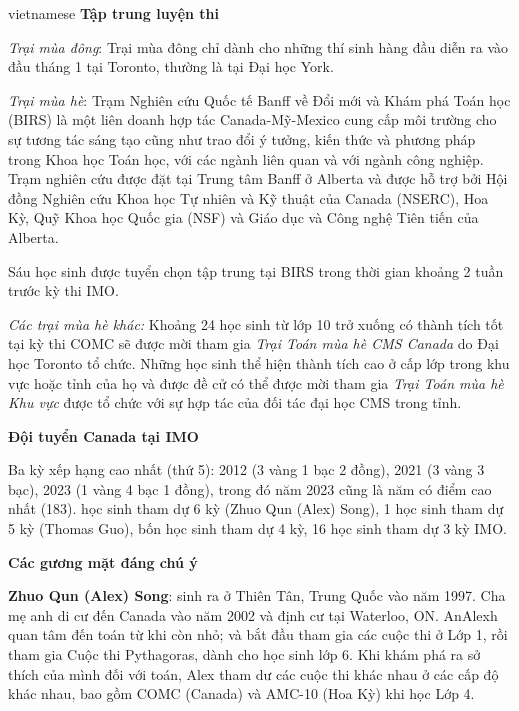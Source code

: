 \documentclass{article}
\begin{document}
\begin{otherlanguage*}{vietnamese}
\newpage
\textbf{Tập trung luyện thi}

\textit{Trại mùa đông}: Trại mùa đông chỉ dành cho những thí sinh hàng đầu diễn ra vào đầu tháng 1 tại Toronto, thường là tại Đại học York.

\textit{Trại mùa hè}: Trạm Nghiên cứu Quốc tế Banff về Đổi mới và Khám phá Toán học (BIRS) là một liên doanh hợp tác Canada-Mỹ-Mexico cung cấp môi trường cho sự tương tác sáng tạo cũng như trao đổi ý tưởng,
kiến thức và phương pháp trong Khoa học Toán học, với các ngành liên quan và với ngành công nghiệp.
Trạm nghiên cứu được đặt tại Trung tâm Banff ở Alberta và được hỗ trợ bởi Hội đồng Nghiên cứu Khoa học Tự nhiên và Kỹ thuật của Canada (NSERC), Hoa Kỳ,
Quỹ Khoa học Quốc gia (NSF) và Giáo dục và Công nghệ Tiên tiến của Alberta.

Sáu học sinh được tuyển chọn tập trung tại BIRS trong thời gian khoảng 2 tuần trước kỳ thi IMO. 

\textit{Các trại mùa hè khác:} Khoảng 24 học sinh từ lớp 10 trở xuống có thành tích tốt tại kỳ thi COMC sẽ được mời tham gia \textit{Trại Toán mùa hè CMS Canada } do Đại học Toronto tổ chức.
Những học sinh thể hiện thành tích cao ở cấp lớp trong khu vực hoặc tỉnh của họ và được đề cử có thể được mời tham gia \textit{Trại Toán mùa hè Khu vực}
được tổ chức với sự hợp tác của đối tác đại học CMS trong tỉnh.

\bigbreak
\textbf{Đội tuyển Canada tại IMO}

\begin{itemize}[topsep=0pt, partopsep=0pt, itemsep=0pt]
    \ii Ba kỳ xếp hạng cao nhất (thứ 5): 2012 (3 vàng 1 bạc 2 đồng), 2021 (3 vàng 3 bạc), 2023 (1 vàng 4 bạc 1 đồng), trong đó năm 2023 cũng là năm có điểm cao nhất (183).
     học sinh tham dự 6 kỳ (Zhuo Qun (Alex) Song), 1 học sinh tham dự 5 kỳ (Thomas Guo), bốn học sinh tham dự 4 kỳ, 16 học sinh tham dự 3 kỳ IMO.
\end{itemize}

\bigbreak
\textbf{Các gương mặt đáng chú ý}

\textbf{Zhuo Qun (Alex) Song}: sinh ra ở Thiên Tân, Trung Quốc vào năm 1997. Cha mẹ anh di cư đến Canada vào năm 2002 và định cư tại Waterloo, ON.
AnAlexh quan tâm đến toán từ khi còn nhỏ; và bắt đầu tham gia các cuộc thi ở Lớp 1, rồi tham gia Cuộc thi Pythagoras, dành cho học sinh lớp 6.
Khi khám phá ra sở thích của mình đối với toán, Alex tham dư các cuộc thi khác nhau ở các cấp độ khác nhau, bao gồm COMC (Canada) và AMC-10 (Hoa Kỳ) khi học Lớp 4.


\end{otherlanguage*}
\end{document}
